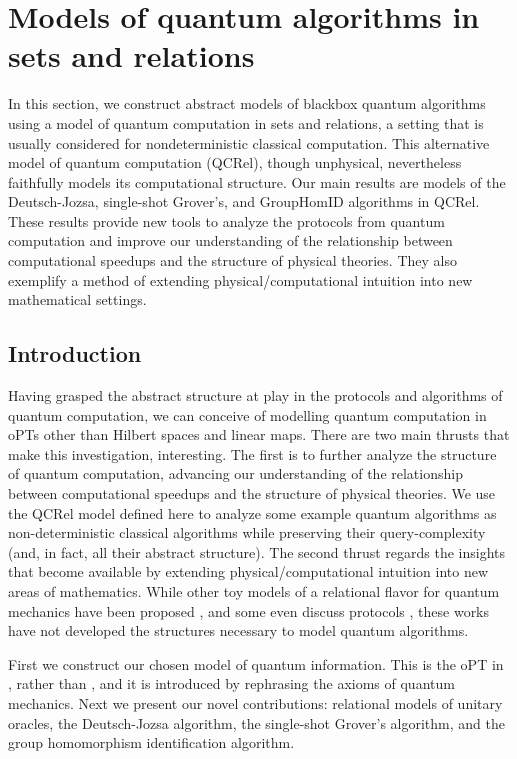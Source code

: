 \section{Models of quantum algorithms in sets and relations}
\label{sec:qalgrel}

        In this section, we construct abstract models of blackbox quantum algorithms using a model of quantum computation in sets and relations, a setting that is usually considered for nondeterministic classical computation.  This alternative model of quantum computation (QCRel), though unphysical, nevertheless faithfully models its computational structure.  Our main results are models of the Deutsch-Jozsa, single-shot Grover's, and GroupHomID algorithms in QCRel. These results provide new tools to analyze the protocols from quantum computation and improve our understanding of the relationship between computational speedups and the structure of physical theories. They also exemplify a method of extending physical/computational intuition into new mathematical settings.

\subsection{Introduction}

Having grasped the abstract structure at play in the protocols and algorithms of quantum computation, we can conceive of modelling quantum computation in oPTs other than Hilbert spaces and linear maps.  There are two main thrusts that make this investigation, interesting.  The first is to further analyze the structure of quantum computation, advancing our understanding of the relationship between computational speedups and the structure of physical theories. We use the QCRel model defined here to analyze some example quantum algorithms as non-deterministic classical algorithms while preserving their query-complexity (and, in fact, all their abstract structure). The second thrust regards the insights that become available by extending physical/computational intuition into new areas of mathematics. While other toy models of a relational flavor for quantum mechanics have been proposed \cite{ellermanModelQM,discreteQT,modalQT,spekk}, and some even discuss protocols \cite{QCFF_James}, these works have not developed the structures necessary to model quantum algorithms.

First we construct our chosen model of quantum information.  This is the oPT in , rather than , and it is introduced by rephrasing the axioms of quantum mechanics. Next we present our novel contributions: relational models of unitary oracles, the Deutsch-Jozsa algorithm, the single-shot Grover's algorithm, and the group homomorphism identification algorithm.

